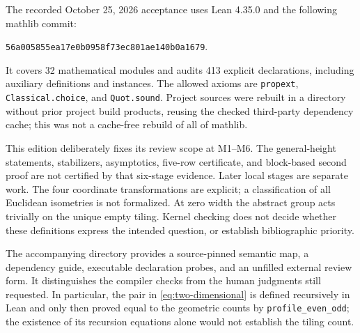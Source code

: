 The recorded October 25, 2026 acceptance uses Lean 4.35.0 and
the following mathlib commit:
\begin{center}
\small\texttt{56a005855ea17e0b0958f73ec801ae140b0a1679}.
\end{center}
It covers 32 mathematical modules and audits 413 explicit declarations,
including auxiliary definitions and instances. The allowed axioms
are \texttt{propext}, \texttt{Classical.choice}, and \texttt{Quot.sound}.
Project sources were rebuilt in a directory without prior project
build products, reusing the checked third-party dependency cache;
this was not a cache-free rebuild of all of mathlib.

This edition deliberately fixes its review scope at M1--M6.
The general-height statements, stabilizers, asymptotics, five-row
certificate, and block-based second proof are not certified by that
six-stage evidence. Later local stages are separate work.
The four coordinate transformations are explicit; a classification
of all Euclidean isometries is not formalized. At zero width the
abstract group acts trivially on the unique empty tiling.
Kernel checking does not decide whether these definitions express
the intended question, or establish bibliographic priority.

The accompanying  directory provides a source-pinned
semantic map, a dependency guide, executable declaration probes,
and an unfilled external review form. It distinguishes the compiler
checks from the human judgments still requested. In particular,
the pair in \eqref{eq:two-dimensional} is defined recursively in Lean
and only then proved equal to the geometric counts by
\texttt{profile\_even\_odd}; the existence of its recursion equations
alone would not establish the tiling count.

